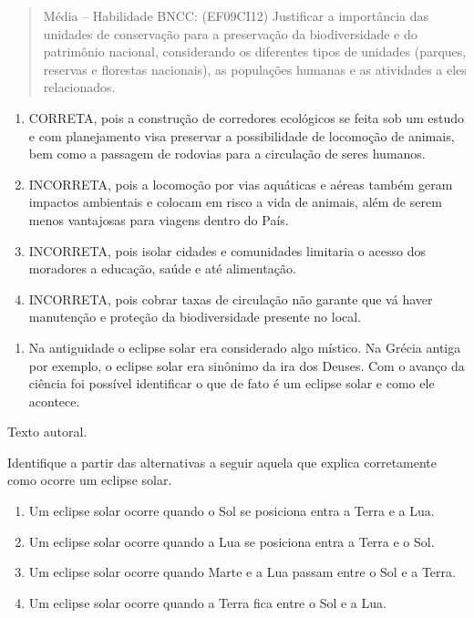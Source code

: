 \begin{quote}
Média -- Habilidade BNCC: (EF09CI12) Justificar a importância das
unidades de conservação para a preservação da biodiversidade e do
patrimônio nacional, considerando os diferentes tipos de unidades
(parques, reservas e florestas nacionais), as populações humanas e as
atividades a eles relacionados.
\end{quote}

\begin{enumerate}
\def\labelenumi{(\Alph{enumi})}
\item
  CORRETA, pois a construção de corredores ecológicos se feita sob um
  estudo e com planejamento visa preservar a possibilidade de locomoção
  de animais, bem como a passagem de rodovias para a circulação de seres
  humanos.
\item
  INCORRETA, pois a locomoção por vias aquáticas e aéreas também geram
  impactos ambientais e colocam em risco a vida de animais, além de
  serem menos vantajosas para viagens dentro do País.
\item
  INCORRETA, pois isolar cidades e comunidades limitaria o acesso dos
  moradores a educação, saúde e até alimentação.
\item
  INCORRETA, pois cobrar taxas de circulação não garante que vá haver
  manutenção e proteção da biodiversidade presente no local.
\end{enumerate}

\begin{enumerate}
\def\labelenumi{\arabic{enumi})}
\item
  Na antiguidade o eclipse solar era considerado algo místico. Na Grécia
  antiga por exemplo, o eclipse solar era sinônimo da ira dos Deuses.
  Com o avanço da ciência foi possível identificar o que de fato é um
  eclipse solar e como ele acontece.
\end{enumerate}

Texto autoral.

Identifique a partir das alternativas a seguir aquela que explica
corretamente como ocorre um eclipse solar.

\begin{enumerate}
\def\labelenumi{(\Alph{enumi})}
\item
  Um eclipse solar ocorre quando o Sol se posiciona entra a Terra e a
  Lua.
\item
  Um eclipse solar ocorre quando a Lua se posiciona entra a Terra e o
  Sol.
\item
  Um eclipse solar ocorre quando Marte e a Lua passam entre o Sol e a
  Terra.
\item
  Um eclipse solar ocorre quando a Terra fica entre o Sol e a Lua.
\end{enumerate}

